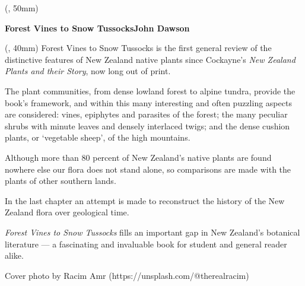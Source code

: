 	\begin{textblock*}{1pt} (\spineoffset-7pt, 50mm)
		\centering%
		\begin{rotate}{-90}
			\fontsize{18}{18}\selectfont%
			\textbf{Forest Vines to Snow Tussocks\hspace{11em}John Dawson}
		\end{rotate}
	\end{textblock*}

	\begin{textblock*}{\backcoverwidth} (\backcoveroffset, 40mm)
		\Large\centering%
		\setlength{\parskip}{1em}%
		Forest Vines to Snow Tussocks is the first general review of the distinctive features of New Zealand native plants since Cockayne's \emph{New Zealand Plants and their Story}, now long out of print.

		The plant communities, from dense lowland forest to alpine tundra, provide the book's framework, and within this many interesting and often puzzling aspects are considered: vines, epiphytes and parasites of the forest; the many peculiar shrubs with minute leaves and densely interlaced twigs; and the dense cushion plants, or `vegetable sheep', of the high mountains.

		Although more than 80 percent of New Zealand's native plants are found nowhere else our flora does not stand alone, so comparisons are made with the plants of other southern lands.

		In the last chapter an attempt is made to reconstruct the history of the New Zealand flora over geological time.

		\emph{Forest Vines to Snow Tussocks} fills an important gap in New Zealand's botanical literature — a fascinating and invaluable book for student and general reader alike.
		
		\vspace{5em}%
		{\small Cover photo by Racim Amr (https://unsplash.com/@therealracim)}
	\end{textblock*}

	\ISBNgraphic{}


